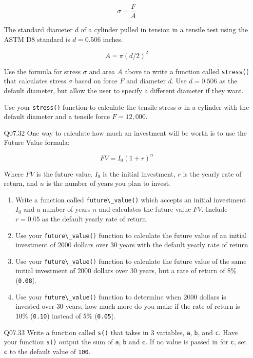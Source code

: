 \documentclass{book}
\newcommand{\passthrough}[1]{#1}
\begin{document}
\[ \sigma = \frac{F}{A} \]

The standard diameter \(d\) of a cylinder pulled in tension in a tensile
test using the ASTM D8 standard is \(d=0.506\) inches.

\[ A = \pi(d/2)^2 \]

Use the formula for stress \(\sigma\) and area \(A\) above to write a
function called \passthrough{\lstinline!stress()!} that calculates
stress \(\sigma\) based on force \(F\) and diameter \(d\). Use
\(d=0.506\) as the default diameter, but allow the user to specify a
different diameter if they want.

Use your \passthrough{\lstinline!stress()!} function to calculate the
tensile stress \(\sigma\) in a cylinder with the default diameter and a
tensile force \(F = 12,000\).

Q07.32 One way to calculate how much an investment will be worth is to
use the Future Value formula:

\[ FV = I_0(1 + r)^n \]

Where \(FV\) is the future value, \(I_0\) is the initial investment,
\(r\) is the yearly rate of return, and \(n\) is the number of years you
plan to invest.

\begin{enumerate}
\def\labelenumi{(\alph{enumi})}
\item
  Write a function called \passthrough{\lstinline!future\_value()!}
  which accepts an initial investment \(I_0\) and a number of years
  \(n\) and calculates the future value \(FV\). Include \(r=0.05\) as
  the default yearly rate of return.
\item
  Use your \passthrough{\lstinline!future\_value()!} function to
  calculate the future value of an initial investment of 2000 dollars
  over 30 years with the default yearly rate of return
\item
  Use your \passthrough{\lstinline!future\_value()!} function to
  calculate the future value of the same initial investment of 2000
  dollars over 30 years, but a rate of return of 8\%
  (\passthrough{\lstinline!0.08!}).
\item
  Use your \passthrough{\lstinline!future\_value()!} function to
  determine when 2000 dollars is invested over 30 years, how much more
  do you make if the rate of return is 10\%
  (\passthrough{\lstinline!0.10!}) instead of 5\%
  (\passthrough{\lstinline!0.05!}).
\end{enumerate}

Q07.33 Write a function called \passthrough{\lstinline!s()!} that takes
in 3 variables, \passthrough{\lstinline!a!},
\passthrough{\lstinline!b!}, and \passthrough{\lstinline!c!}. Have your
function \passthrough{\lstinline!s()!} output the sum of
\passthrough{\lstinline!a!}, \passthrough{\lstinline!b!} and
\passthrough{\lstinline!c!}. If no value is passed in for
\passthrough{\lstinline!c!}, set \passthrough{\lstinline!c!} to the
default value of \passthrough{\lstinline!100!}.
    
\end{document}
